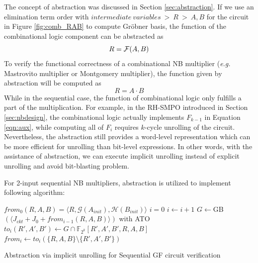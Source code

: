 The concept of abstraction was discussed in Section \ref{sec:abstraction}. If we use an elimination term order with
$intermediate~variables~>~R~>~A,B$ for the circuit in Figure \ref{fig:comb_RAB} to compute Gr\"obner basis, 
the function of the combinational logic component can be abstracted as 
$$R = {\mathcal{F}}(A,B)$$
To verify the functional correctness of a combinational NB multiplier ({\it e.g.} Mastrovito multiplier
or Montgomery multiplier), the function given by abstraction will be computed as
$$R=A\cdot B$$
While in the sequential case, the function of combinational logic only fulfills a part of the multiplication.
For example, in the RH-SMPO introduced in Section \ref{sec:nbdesign}, 
the combinational logic actually implements  $F_{k-1}$ in Equation \ref{eqn:aux},
while computing all of $F_i$ requires $k$-cycle unrolling of the circuit.
Nevertheless, the abstraction still provides a word-level 
representation which can be more efficient for unrolling than bit-level expressions.
In other words, with the assistance of abstraction, we can execute implicit unrolling instead of 
explicit unrolling and avoid bit-blasting problem.

For 2-input sequential NB multipliers, abstraction is utilized to implement following algorithm:
\IncMargin{1em}
\begin{algorithm}[hbt]
\SetAlgoNoLine
\LinesNumbered
  $from_0(R,A,B) = \langle R, \mathcal{G}(A_{init}), \mathcal{H}(B_{init})\rangle$\;
  $i = 0$\;
  {
  	$i \gets i + 1$\;
	$G \gets$GB$( \langle J_{ckt} + J_0+ from_{i-1}(R,A,B) \rangle
    )$ with ATO\;
	$to_i(R',A',B')\gets G\cap \mathbb F_{2^k}[R',A',B',R,A,B]$\;
	$from_i \gets to_i(\{R,A,B\}\setminus \{R',A',B'\})$\;
  }
\caption {Abstraction via implicit unrolling for Sequential GF circuit
  verification}
\label{alg:modified}
\end{algorithm}
\DecMargin{1em}

